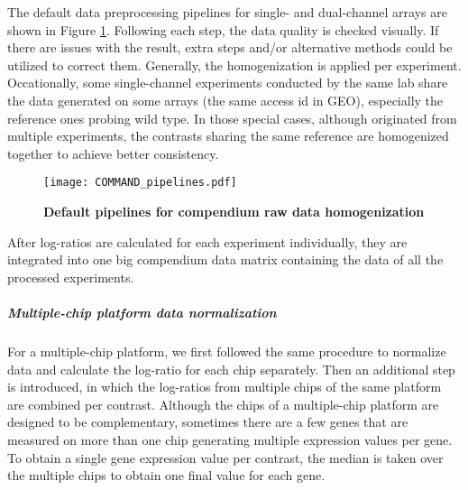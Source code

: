 %
The default data preprocessing pipelines for single- and dual-channel
arrays are shown in Figure \ref{fig:command-pipelines}.
%
Following each step, the data quality is checked visually.  If there
are issues with the result, extra steps and/or alternative methods
could be utilized to correct them.
%
%
Generally, the homogenization is applied per experiment.  
%
Occationally, some single-channel experiments conducted by the same lab share
the data generated on some arrays (the same access id in GEO), especially the
reference ones probing wild type.
%
%
In those special cases, although originated from multiple experiments,
the contrasts sharing the same reference are homogenized together to
achieve better consistency.
%
\begin{figure}
  \centering
  \texttt{[image: COMMAND\_pipelines.pdf]}
  \caption[Default pipelines for compendium raw data homogenization]{
    \textbf{Default pipelines for compendium raw data homogenization}}
  \label{fig:command-pipelines}
\end{figure}
%
After log-ratios are calculated for each experiment individually, they are
integrated into one big compendium data matrix containing the data of all the
processed experiments.

\subparagraph{Multiple-chip platform data normalization}\label{sec:command-multichip-norm}
For a multiple-chip platform, we first followed the same procedure to
normalize data and calculate the log-ratio for each chip separately.
%
Then an additional step is introduced, in which the log-ratios from multiple
chips of the same platform are combined per contrast.
%
Although the chips of a multiple-chip platform are designed to be
complementary, sometimes there are a few genes that are measured on more than
one chip generating multiple expression values per gene.
%
To obtain a single gene expression value per contrast, the median is taken
over the multiple chips to obtain one final value for each gene.


